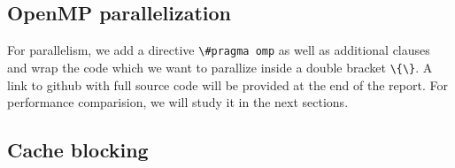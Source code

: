 \documentclass[
  12pt,
  xcolor = usenames,dvipsnames]{article}
\newcommand{\passthrough}[1]{#1}
\begin{document}
\hypertarget{openmp-parallelization}{%
\subsection{OpenMP parallelization}\label{openmp-parallelization}}

For parallelism, we add a directive \passthrough{\lstinline!\#pragma omp!} as well as additional clauses and wrap the code which we want to parallize inside a double bracket \passthrough{\lstinline!\{\}!}. A link to github with full source code will be provided at the end of the report. For performance comparision, we will study it in the next sections.

\hypertarget{cache-blocking}{%
\subsection{Cache blocking}\label{cache-blocking}}
\end{document}
